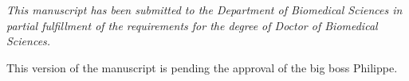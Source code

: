 
\vspace*{\fill}
\begin{center}
{\it This manuscript has been submitted to the Department of Biomedical Sciences 
in partial fulfillment of the requirements for the degree of Doctor of Biomedical Sciences.

\vskip1cm

This version of the manuscript is pending the approval
of the big boss Philippe.
}%
\end{center}
\vspace*{\fill}
\vspace*{\fill}
\vspace*{\fill}
